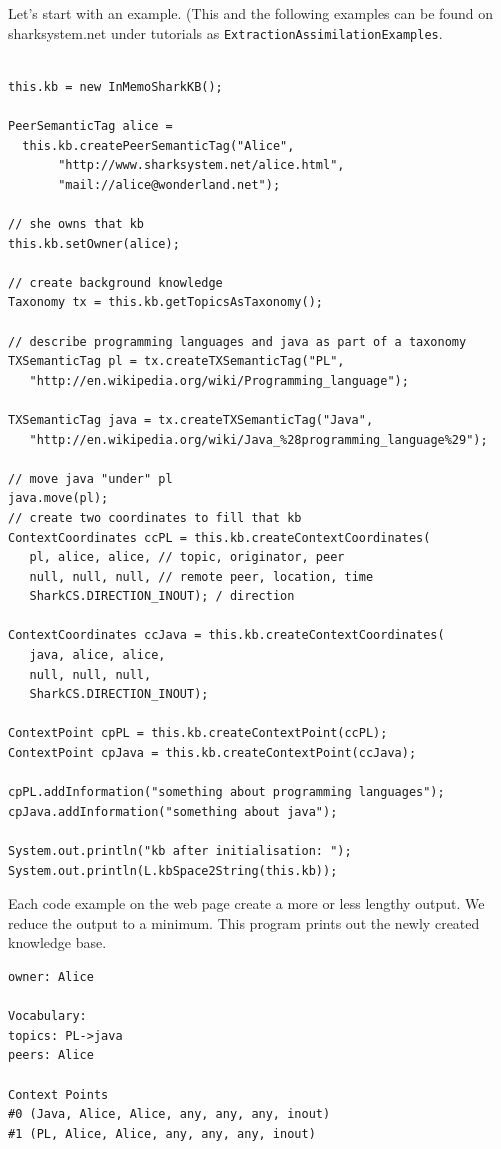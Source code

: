 Let's start with an example. (This and the following examples can be found on sharksystem.net under tutorials as {\tt ExtractionAssimilationExamples}.

\begin{verbatim}

this.kb = new InMemoSharkKB();

PeerSemanticTag alice =
  this.kb.createPeerSemanticTag("Alice",
       "http://www.sharksystem.net/alice.html",
       "mail://alice@wonderland.net");

// she owns that kb
this.kb.setOwner(alice);

// create background knowledge
Taxonomy tx = this.kb.getTopicsAsTaxonomy();

// describe programming languages and java as part of a taxonomy
TXSemanticTag pl = tx.createTXSemanticTag("PL",
   "http://en.wikipedia.org/wiki/Programming_language");

TXSemanticTag java = tx.createTXSemanticTag("Java",
   "http://en.wikipedia.org/wiki/Java_%28programming_language%29");

// move java "under" pl
java.move(pl);
// create two coordinates to fill that kb
ContextCoordinates ccPL = this.kb.createContextCoordinates(
   pl, alice, alice, // topic, originator, peer
   null, null, null, // remote peer, location, time
   SharkCS.DIRECTION_INOUT); / direction

ContextCoordinates ccJava = this.kb.createContextCoordinates(
   java, alice, alice,
   null, null, null,
   SharkCS.DIRECTION_INOUT);

ContextPoint cpPL = this.kb.createContextPoint(ccPL);
ContextPoint cpJava = this.kb.createContextPoint(ccJava);

cpPL.addInformation("something about programming languages");
cpJava.addInformation("something about java");

System.out.println("kb after initialisation: ");
System.out.println(L.kbSpace2String(this.kb));
\end{verbatim}

Each code example on the web page create a more or less lengthy output. We reduce the output to a minimum. This program prints out the newly created knowledge base.

\begin{verbatim}
owner: Alice

Vocabulary:
topics: PL->java
peers: Alice

Context Points
#0 (Java, Alice, Alice, any, any, any, inout)
#1 (PL, Alice, Alice, any, any, any, inout)
\end{verbatim}

